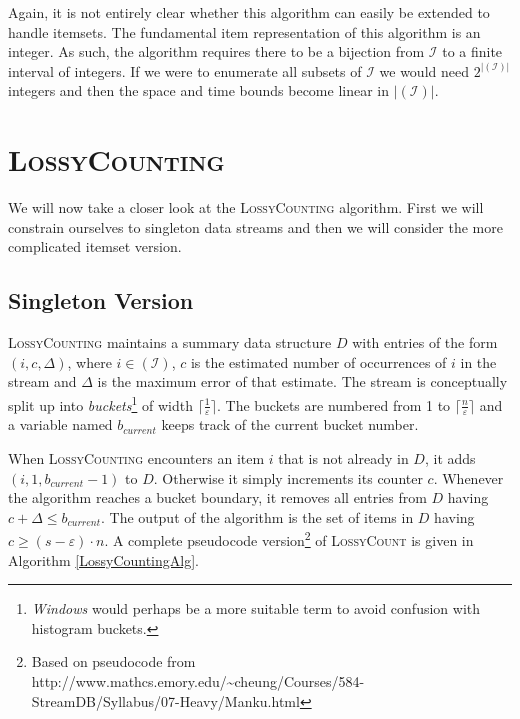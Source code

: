\documentclass[landscape,twocolumn,a4paper]{article}
\begin{document}
Again, it is not entirely clear whether this algorithm can easily be extended to handle itemsets. The fundamental item representation of this algorithm is an integer. As such, the algorithm requires there to be a bijection from $\mathcal{I}$ to a finite interval of integers. If we were to enumerate all subsets of $\mathcal{I}$ we would need $2^{|\mathcal{(I)}|}$ integers and then the space and time bounds become linear in $|\mathcal{(I)}|$.

\section{\textsc{LossyCounting}}\label{LossyCounting}
We will now take a closer look at the \textsc{LossyCounting} algorithm. First we will constrain ourselves to singleton data streams and then we will consider the more complicated itemset version.

\subsection{Singleton Version}

\textsc{LossyCounting} maintains a summary data structure $D$ with entries of the form $(i, c, \Delta)$, where $i \in \mathcal{(I)}$, $c$ is the estimated number of occurrences of $i$ in the stream and $\Delta$ is the maximum error of that estimate. The stream is conceptually split up into \textit{buckets}\footnote{\textit{Windows} would perhaps be a more suitable term to avoid confusion with histogram buckets.} of width $\lceil \frac{1}{\varepsilon} \rceil$. The buckets are numbered from 1 to $\lceil \frac{n}{\varepsilon} \rceil$ and a variable named $b_{current}$ keeps track of the current bucket number.

When \textsc{LossyCounting} encounters an item $i$ that is not already in $D$, it adds $(i, 1, b_{current} - 1)$ to $D$. Otherwise it simply increments its counter $c$. Whenever the algorithm reaches a bucket boundary, it removes all entries from $D$ having $c + \Delta \leq b_{current}$. The output of the algorithm is the set of items in $D$ having $c \geq (s-\varepsilon)\cdot n$. A complete pseudocode version\footnote{Based on pseudocode from http://www.mathcs.emory.edu/\textasciitilde cheung/Courses/584-StreamDB/Syllabus/07-Heavy/Manku.html} of \textsc{LossyCount} is given in Algorithm \ref{LossyCountingAlg}.
\end{document}
